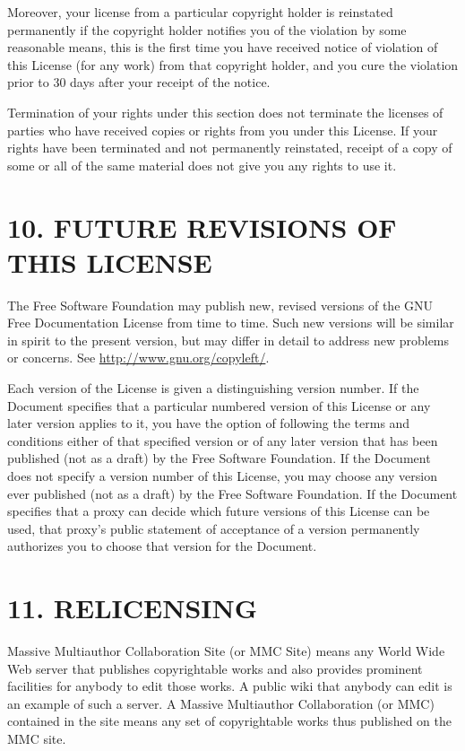 \documentclass[captions=tableheading]{scrbook}
\begin{document}
Moreover, your license from a particular copyright holder is reinstated permanently if the copyright holder notifies you of the violation by some reasonable means, this is the first time you have received notice of violation of this License (for any work) from that copyright holder, and you cure the violation prior to 30 days after your receipt of the notice. 

Termination of your rights under this section does not terminate the licenses of parties who have received copies or rights from you under this License. If your rights have been terminated and not permanently reinstated, receipt of a copy of some or all of the same material does not give you any rights to use it.
\section{10. FUTURE REVISIONS OF THIS LICENSE}
\label{sec-18-11}


The Free Software Foundation may publish new, revised versions of the GNU Free Documentation License from time to time. Such new versions will be similar in spirit to the present version, but may differ in detail to address new problems or concerns. See \href{http://www.gnu.org/copyleft/}{http://www.gnu.org/copyleft/}.

Each version of the License is given a distinguishing version number. If the Document specifies that a particular numbered version of this License or any later version applies to it, you have the option of following the terms and conditions either of that specified version or of any later version that has been published (not as a draft) by the Free Software Foundation. If the Document does not specify a version number of this License, you may choose any version ever published (not as a draft) by the Free Software Foundation. If the Document specifies that a proxy can decide which future versions of this License can be used, that proxy's public statement of acceptance of a version permanently authorizes you to choose that version for the Document.
\section{11. RELICENSING}
\label{sec-18-12}


Massive Multiauthor Collaboration Site (or MMC Site) means any World Wide Web server that publishes copyrightable works and also provides prominent facilities for anybody to edit those works. A public wiki that anybody can edit is an example of such a server. A Massive Multiauthor Collaboration (or MMC) contained in the site means any set of copyrightable works thus published on the MMC site.
\end{document}
